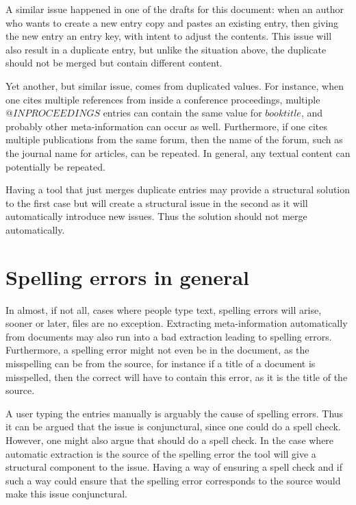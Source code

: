 A similar issue happened in one of the drafts for this document: when
an author who wants to create a new entry copy and pastes an existing
entry, then giving the new entry an entry key, with intent to adjust
the contents.  This issue will also result in a duplicate entry, but
unlike the situation above, the duplicate should not be merged but
contain different content.

Yet another, but similar issue, comes from duplicated values.  For
instance, when one cites multiple references from inside a conference
proceedings, multiple $@INPROCEEDINGS$ entries can contain the same
value for $booktitle$, and probably other meta-information can occur
as well.  Furthermore, if one cites multiple publications from the
same forum, then the name of the forum, such as the journal name for
articles, can be repeated.  In general, any textual content can
potentially be repeated.

Having a tool that just merges duplicate entries may provide a
structural solution to the first case but will create a structural
issue in the second as it will automatically introduce new issues.
Thus the solution should not merge automatically.


\section{Spelling errors in general}
\label{sec:problems_spelling}

In almost, if not all, cases where people type text, spelling errors
will arise, sooner or later, {\bibtex} files are no exception.
Extracting meta-information automatically from documents may also run
into a bad extraction leading to spelling errors.  Furthermore, a
spelling error might not even be in the {\bibtex} document, as the
misspelling can be from the source, for instance if a title of a
document is misspelled, then the correct {\bibtex} will have to
contain this error, as it is the title of the source.

A user typing the entries manually is arguably the cause of spelling
errors.  Thus it can be argued that the issue is conjunctural, since
one could do a spell check.  However, one might also argue that
{\bibtex} should do a spell check.  In the case where automatic
extraction is the source of the spelling error the tool will give a
structural component to the issue.  Having a way of ensuring a spell
check and if such a way could ensure that the spelling error
corresponds to the source would make this issue conjunctural.


